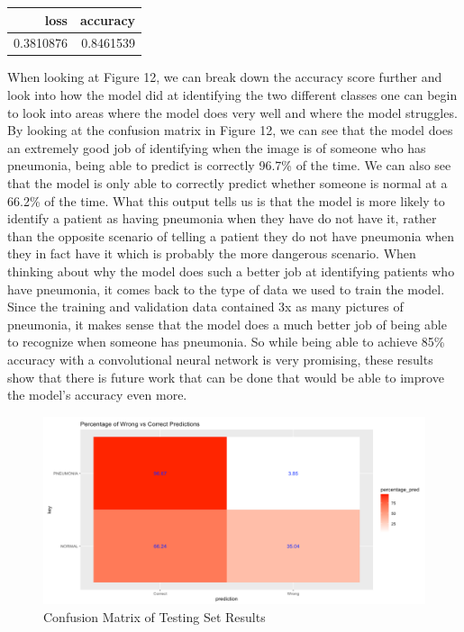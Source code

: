 \documentclass[12pt]{article}
\begin{document}
\begin{tabular}{r|r}
\hline
loss & accuracy\\
\hline
0.3810876 & 0.8461539\\
\hline
\end{tabular}

When looking at Figure 12, we can break down the accuracy score further
and look into how the model did at identifying the two different classes
one can begin to look into areas where the model does very well and
where the model struggles. By looking at the confusion matrix in Figure
12, we can see that the model does an extremely good job of identifying
when the image is of someone who has pneumonia, being able to predict is
correctly 96.7\% of the time. We can also see that the model is only
able to correctly predict whether someone is normal at a 66.2\% of the
time. What this output tells us is that the model is more likely to
identify a patient as having pneumonia when they have do not have it,
rather than the opposite scenario of telling a patient they do not have
pneumonia when they in fact have it which is probably the more dangerous
scenario. When thinking about why the model does such a better job at
identifying patients who have pneumonia, it comes back to the type of
data we used to train the model. Since the training and validation data
contained 3x as many pictures of pneumonia, it makes sense that the
model does a much better job of being able to recognize when someone has
pneumonia. So while being able to achieve 85\% accuracy with a
convolutional neural network is very promising, these results show that
there is future work that can be done that would be able to improve the
model's accuracy even more.

\begin{figure}

{\centering \includegraphics[width=0.75\linewidth,height=0.25\textheight]{images/heatmap} 

}

\caption{Confusion Matrix of Testing Set Results}\label{fig:sample-fig12}
\end{figure}
\end{document}
